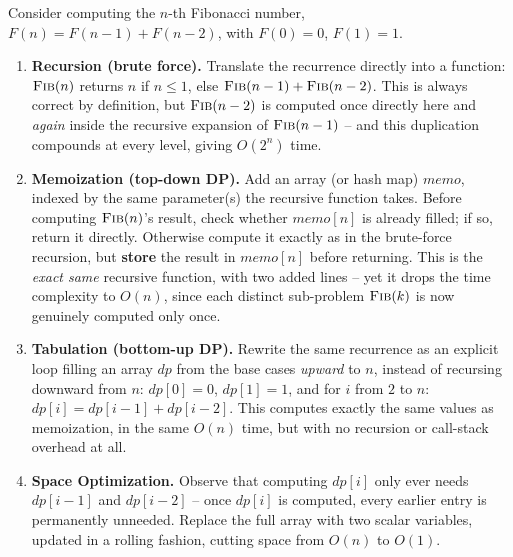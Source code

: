 \begin{ideabox}
Consider computing the $n$-th Fibonacci number, $F(n) = F(n-1) + F(n-2)$,
with $F(0)=0$, $F(1)=1$.

\begin{enumerate}
  \item \textbf{Recursion (brute force).} Translate the recurrence
        directly into a function: $\textsc{Fib}(n)$ returns $n$ if $n
        \le 1$, else $\textsc{Fib}(n-1) + \textsc{Fib}(n-2)$. This is
        always correct by definition, but $\textsc{Fib}(n-2)$ is
        computed once directly here and \emph{again} inside the
        recursive expansion of $\textsc{Fib}(n-1)$ -- and this
        duplication compounds at every level, giving $O(2^n)$ time.
  \item \textbf{Memoization (top-down DP).} Add an array (or hash map)
        $\textit{memo}$, indexed by the same parameter(s) the recursive
        function takes. Before computing $\textsc{Fib}(n)$'s result,
        check whether $\textit{memo}[n]$ is already filled; if so,
        return it directly. Otherwise compute it exactly as in the
        brute-force recursion, but \textbf{store} the result in
        $\textit{memo}[n]$ before returning. This is the \emph{exact
        same} recursive function, with two added lines -- yet it drops
        the time complexity to $O(n)$, since each distinct sub-problem
        $\textsc{Fib}(k)$ is now genuinely computed only once.
  \item \textbf{Tabulation (bottom-up DP).} Rewrite the same recurrence
        as an explicit loop filling an array $\textit{dp}$ from the base
        cases \emph{upward} to $n$, instead of recursing downward from
        $n$: $\textit{dp}[0]=0$, $\textit{dp}[1]=1$, and for $i$ from $2$
        to $n$: $\textit{dp}[i] = \textit{dp}[i-1] + \textit{dp}[i-2]$.
        This computes exactly the same values as memoization, in the
        same $O(n)$ time, but with no recursion or call-stack overhead
        at all.
  \item \textbf{Space Optimization.} Observe that computing
        $\textit{dp}[i]$ only ever needs $\textit{dp}[i-1]$ and
        $\textit{dp}[i-2]$ -- once $\textit{dp}[i]$ is computed, every
        earlier entry is permanently unneeded. Replace the full array
        with two scalar variables, updated in a rolling fashion, cutting
        space from $O(n)$ to $O(1)$.
\end{enumerate}
\end{ideabox}

